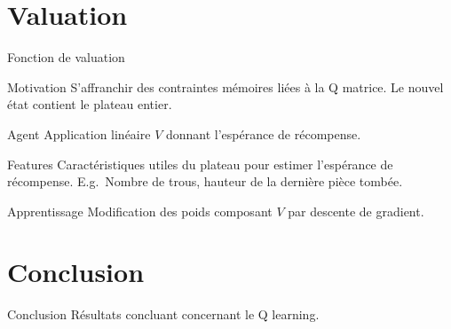 \documentclass[tikz, footheight=2em]{beamer}
\begin{document}
\section{Valuation}
\begin{frame}[c]{Fonction de valuation}
  \begin{block}{Motivation}
    S'affranchir des contraintes mémoires liées à la Q matrice. Le nouvel état
    contient le plateau entier.
  \end{block}
  \pause{}
  \begin{block}{Agent}
    Application linéaire \(V\) donnant l'espérance de récompense.
  \end{block}
  \pause{}
  \begin{exampleblock}{Features}
    Caractéristiques utiles du plateau pour estimer l'espérance de récompense.
    E.g.\ Nombre de trous, hauteur de la dernière pièce tombée.
  \end{exampleblock}
  \pause{}
  \begin{block}{Apprentissage}
    Modification des poids composant \(V\) par descente de gradient.
  \end{block}
\end{frame}

\section*{Conclusion}
\begin{frame}[c]{Conclusion}
  Résultats concluant concernant le Q learning.
\end{frame}
\end{document}
